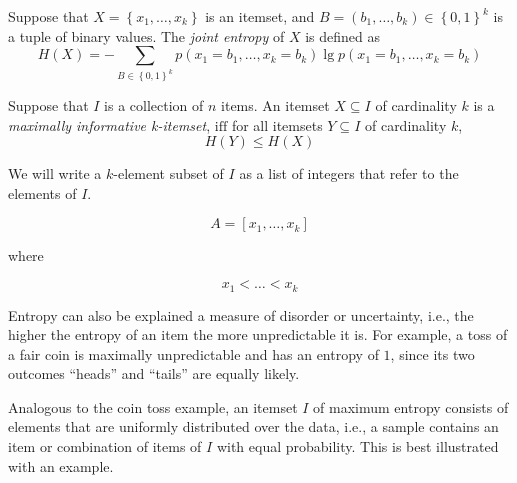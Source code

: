\begin{definition}
    Suppose that $X = \left\{ x_{1}, \dots, x_{k} \right\}$ is an itemset, and $B = \left( b_{1}, \dots, b_{k} \right) \in \left\{ 0, 1 \right\}^{k}$ is a tuple of binary values. The \emph{joint entropy} of $X$ is defined as
    \begin{equation*}
        H(X) = -\sum_{B \in \left\{ 0, 1 \right\}^{k}} p \left( x_{1} = b_{1}, \dots, x_{k} = b_{k} \right) \lg p \left( x_{1} = b_{1}, \dots, x_{k} = b_{k} \right)
    \end{equation*}
    \label{def:joint_entropy}
\end{definition}

\begin{definition}
    Suppose that $I$ is a collection of $n$ items. An itemset $X \subseteq I$ of cardinality $k$ is a \emph{maximally informative k-itemset}, $\mathrm{iff}$ for all itemsets $Y \subseteq I$ of cardinality $k$,
    \begin{equation}
        H(Y) \leq H(X)
    \end{equation}
    \label{def:miki}
\end{definition}

We will write a $k$-element subset of $I$ as a list of integers that refer to the elements of $I$.

\begin{equation*}
    A = \left[ x_{1}, \dots, x_{k} \right]
\end{equation*}

\noindent where

\begin{equation*}
    x_{1} < \dots < x_{k}
\end{equation*}

Entropy can also be explained a measure of disorder or uncertainty, i.e., the higher the entropy of an item the more unpredictable it is.
For example, a toss of a fair coin is maximally unpredictable and has an entropy of $1$, since its two outcomes ``heads'' and ``tails'' are equally likely.

Analogous to the coin toss example, an itemset $I$ of maximum entropy consists of elements that are uniformly distributed over the data, i.e., a sample contains an item or combination of items of $I$ with equal probability.
This is best illustrated with an example.


